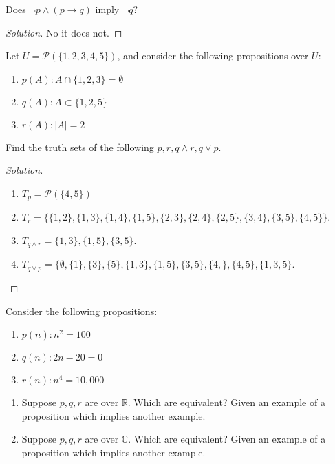 \documentclass[../main.tex]{subfiles}
\begin{document}
\begin{problem}
Does $\neg p\land (p\rightarrow q)$ imply $\neg q$?
\end{problem}
\begin{proof}[Solution]
No it does not.
\end{proof}

\begin{problem}
Let $U = \mathcal{P}(\{1,2,3,4,5\})$, and consider the following propositions over $U$:
\begin{enumerate}
\item[] $p(A):	A\cap\{1,2,3\} = \emptyset$
\item[] $q(A):	A\subset \{1,2,5\}$
\item[] $r(A):	|A| = 2$
\end{enumerate}
Find the truth sets of the following $p,r, q\land r, q\lor p$.
\end{problem}
\begin{proof}[Solution]
\
\begin{enumerate}
\item $T_{p} = \mathcal{P}(\{4,5\})$
\item $T_{r} = \{\{1,2\},\{1,3\},\{1,4\},\{1,5\},\{2,3\},\{2,4\},\{2,5\},\{3,4\},\{3,5\},\{4,5\}\}$.
\item $T_{q\land r} = \{1,3\},\{1,5\},\{3,5\}$.
\item $T_{q\lor p} = \{\emptyset, \{1\},\{3\},\{5\},\{1,3\},\{1,5\},\{3,5\},\{4,\},\{4,5\},\{1,3,5\}$.
\end{enumerate}
\end{proof}

\begin{problem}
Consider the following propositions:
\begin{enumerate}
\item[] $p(n):	n^2 = 100$
\item[] $q(n):	2n-20 = 0$
\item[] $r(n):	n^4 = 10,000$
\end{enumerate}
\begin{enumerate}
\item Suppose $p,q,r$ are over $\mathbb{R}$. Which are equivalent? Given an example of a proposition which implies another example.
\item Suppose $p,q,r$ are over $\mathbb{C}$. Which are equivalent? Given an example of a proposition which implies another example.
\end{enumerate}
\end{problem}
\end{document}
